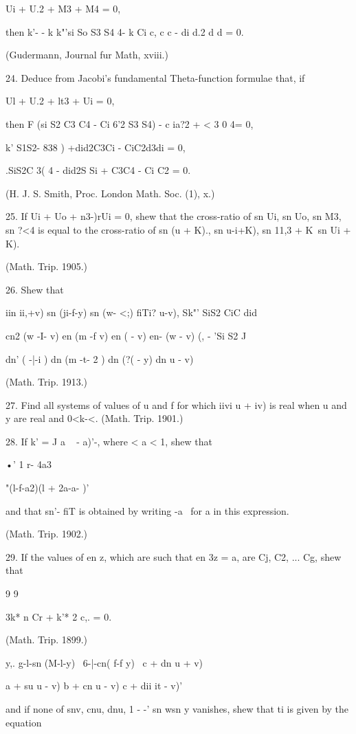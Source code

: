 Ui + U.2 + M3 + M4 = 0,

then k'- - k k"'si So S3 S4 4- k Ci c, c c - di d.2 d d = 0.

(Gudermann, Journal fur Math, xviii.)

24. Deduce from Jacobi's fundamental Theta-function formulae that, if

Ul + U.2 + lt3 + Ui = 0,

then F (si S2 C3 C4 - Ci 6'2 S3 S4) - c ia?2 + < 3 0 4= 0,

k' S1S2- 838 ) +did2C3Ci - CiC2d3di = 0,

.SiS2C 3( 4 - did2S Si + C3C4 - Ci C2 = 0.

(H. J. S. Smith, Proc. London Math. Soc. (1), x.)

25. If Ui + Uo + n3-)rUi = 0, shew that the cross-ratio of sn Ui, sn
Uo, sn M3, sn ?<4 is equal to the cross-ratio of sn (u + K)., sn
u-i+K), sn 11,3 + K\ sn Ui + K).

(Math. Trip. 1905.)

26. Shew that

iin ii,+v) sn (ji-f-y) sn (w- <;) fiTi? u-v), Sk"' SiS2 CiC did

cn2 (w -I- v) en (m -f v) en ( - v) en- (w - v) (, - 'Si S2 J

dn' ( -|-i ) dn (m -t- 2 ) dn (?( - y) dn u - v)

(Math. Trip. 1913.)

27. Find all systems of values of u and f for which iivi u + iv) is
real when u and y are real and 0<k-<. (Math. Trip. 1901.)

28. If k' = J a ~ - a)'-, where < a < 1, shew that

•' 1 r- 4a3

 "(l-f-a2)(l + 2a-a- )'

and that sn'- fiT is obtained by writing -a~ for a in this expression.

(Math. Trip. 1902.)

29. If the values of en z, which are such that en 3z = a, are Cj, C2,
... Cg, shew that

9 9

3k* n Cr + k'* 2 c,. = 0.

(Math. Trip. 1899.)

y,. g-l-sn (M-l-y) \ 6-|-cn( f-f y) \ c + dn u + v)

a + su u - v) b + cn u - v) c + dii it - v)'

and if none of snv, cnu, dnu, 1 - -' sn wsn y vanishes, shew that ti
is given by the equation

